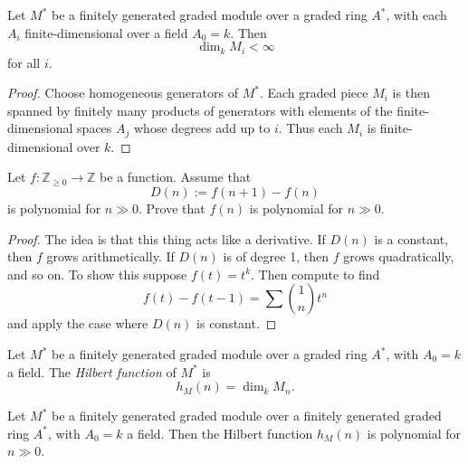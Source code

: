 \begin{lemma}
\label{lemma-graded-module-finite-dim}
Let $M^\ast$ be a finitely generated graded
module over a graded ring $A^\ast$, with
each $A_i$ finite-dimensional over a field
$A_0=k$.
Then
$$
\dim_k M_i<\infty
$$
for all $i$.
\end{lemma}

\begin{proof}
Choose homogeneous generators of $M^\ast$.
Each graded piece $M_i$ is then spanned by
finitely many products of generators with
elements of the finite-dimensional spaces
$A_j$ whose degrees add up to $i$.
Thus each $M_i$ is finite-dimensional over
$k$.
\end{proof}

\begin{exercise}
\label{exercise-hilbert-function-polynomial}
Let $f:\mathbb{Z}_{\geq 0}\to \mathbb{Z}$
be a function.
Assume that
$$
D(n):=f(n+1)-f(n)
$$
is polynomial for $n\gg 0$.
Prove that $f(n)$ is polynomial for
$n\gg 0$.
\end{exercise}

\begin{proof}
The idea is that this thing acts like a
derivative. If $D(n)$ is a constant,
then $f$ grows arithmetically. If
$D(n)$ is of degree 1, then $f$ grows
quadratically, and so on.
To show this suppose $f(t)=t^k$.
Then compute to find
$$
f(t) - f(t-1) = \sum \binom{1}{n}t^n
$$
and apply the case where $D(n)$ is constant.
\end{proof}

\begin{definition}
\label{definition-hilbert-function}
Let $M^\ast$ be a finitely generated graded
module over a graded ring $A^\ast$, with
$A_0=k$ a field.
The {\it Hilbert function} of $M^\ast$ is
$$
h_M(n)=\dim_k M_n.
$$
\end{definition}

\begin{theorem}
\label{theorem-hilbert-function-polynomial}
Let $M^\ast$ be a finitely generated graded
module over a finitely generated graded ring
$A^\ast$, with $A_0=k$ a field.
Then the Hilbert function $h_M(n)$ is
polynomial for $n\gg 0$.
\end{theorem}

